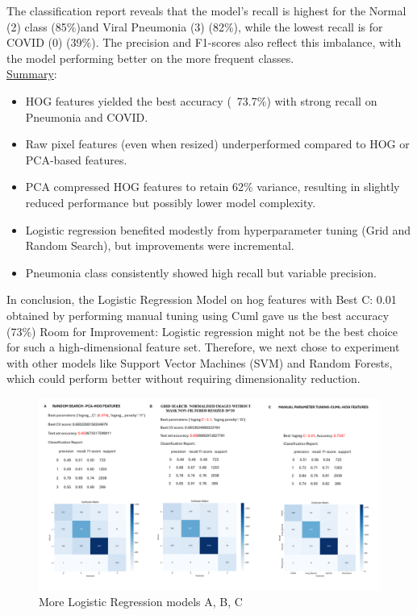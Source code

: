 \documentclass{article}
\begin{document}
The classification report reveals that the model's recall is highest for the Normal (2) class (85\%)and Viral Pneumonia (3) (82\%), while the lowest recall is for COVID (0) (39\%). The precision and F1-scores also reflect this imbalance, with the model performing better on the more frequent classes.
\\
\underline{Summary}:
\begin{itemize}
    \item HOG features yielded the best accuracy (~73.7\%) with strong recall on Pneumonia and COVID.
    \item Raw pixel features (even when resized) underperformed compared to HOG or PCA-based features.
    \item PCA compressed HOG features to retain 62\% variance, resulting in slightly reduced performance but possibly lower model complexity.
    \item Logistic regression benefited modestly from hyperparameter tuning (Grid and Random Search), but improvements were incremental.
    \item Pneumonia class consistently showed high recall but variable precision.
\end{itemize}
In conclusion, the Logistic Regression Model on hog features with Best C: 0.01 obtained by performing manual tuning using Cuml gave us the best accuracy (73\%)
Room for Improvement: Logistic regression might not be the best choice for such a high-dimensional feature set. Therefore, we next chose to experiment with other models like Support Vector Machines (SVM) and Random Forests, which could perform better without requiring dimensionality reduction.


\begin{figure}[H]
    \centering
    \includegraphics[width=1.0\linewidth]{logreg2,a,b,c.png}
    \caption{More Logistic Regression models A, B, C}
    \label{fig:Logistic_Regression_logreg2}
\end{figure}
\end{document}
